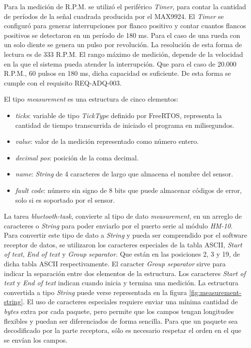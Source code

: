 Para la medición de R.P.M. se utilizó el periférico \textit{Timer}, para contar la cantidad de períodos de la señal cuadrada producida por el MAX9924. El \textit{Timer} se configuró para generar interrupciones por flanco positivo y contar cuantos flancos positivos se detectaron en un período de 180 ms. Para el caso de una rueda con un solo diente se genera un pulso por revolución. La resolución de esta forma de lectura es de 333 R.P.M. El rango máximo de medición, depende de la velocidad en la que el sistema pueda atender la interrupción. Que para el caso de 20.000 R.P.M., 60 pulsos en 180 ms, dicha capacidad es suficiente. De esta forma se cumple con el requisito REQ-ADQ-003.

El tipo \textit{measurement} es una estructura de cinco elementos:

\begin{itemize}
\item{\textit{ticks}:} variable de tipo \textit{TickType} definido por FreeRTOS, representa la cantidad de tiempo transcurrida de iniciado el programa en milisegundos.
\item{\textit{value}:} valor de la medición representado como número entero.
\item{\textit{decimal pos}:} posición de la coma decimal.
\item{\textit{name}:} \textit{String} de 4 caracteres de largo que almacena el nombre del sensor.
\item{\textit{fault code}:} número sin signo de 8 bits que puede almacenar códigos de error, solo si es soportado por el sensor.
\end{itemize}

La tarea \textit{bluetooth-task}, convierte al tipo de dato \textit{measurement}, en un arreglo de caracteres o \textit{String} para poder enviarlo por el puerto serie al módulo \textit{HM-10}. Para convertir este tipo de dato a \textit{String} y pueda ser comprendido por el software receptor de datos, se utilizaron los caracteres especiales de la tabla ASCII, \textit{Start of text}, \textit{End of text} y \textit{Group separator}. Que están en las posiciones 2, 3 y 19, de dicha tabla ASCII respectivamente. El caracter \textit{Group separator} sirve para indicar la separación entre dos elementos de la estructura. Los caracteres \textit{Start of text} y \textit{End of text} indican cuando inicia y termina una medición. La estructura convertida a tipo \textit{String} puede verse representada en la figura \ref{fig:measurement-string}. El uso de caracteres especiales requiere enviar una mínima cantidad de \textit{bytes} extra por cada paquete, pero permite que los campos tengan longitudes flexibles y puedan ser diferenciados de forma sencilla. Para que un paquete sea decodificado por la parte receptora, sólo es necesario respetar el orden en el que se envían los campos.


